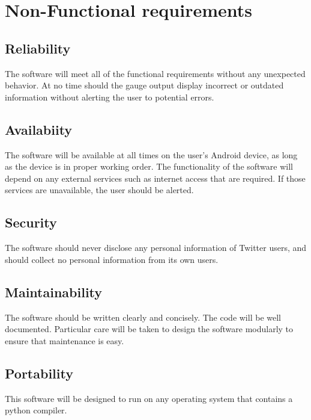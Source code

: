 \section{Non-Functional requirements}
\subsection{Reliability}
The software will meet all of the functional requirements without any unexpected behavior. At no time should the gauge output display incorrect or outdated information without alerting the user to potential errors.
\subsection{Availabiity}
The software will be available at all times on the user’s Android device, as long as the device is in proper working order. The functionality of the software will depend on any external services such as internet access that are required. If those services are unavailable, the user should be alerted.
\subsection{Security}
The software should never disclose any personal information of Twitter users, and should collect no personal information from its own users.
\subsection{Maintainability}
The software should be written clearly and concisely. The code will be well documented. Particular care will be taken to design the software modularly to ensure that maintenance is easy.
\subsection{Portability}
This software will be designed to run on any operating system that contains a python compiler.


